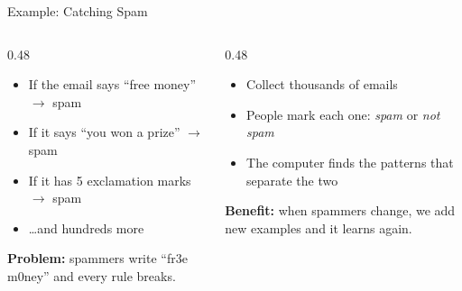 \begin{frame}{Example: Catching Spam}
    \begin{columns}[T]
        \begin{column}{0.48\textwidth}
            \begin{tcolorbox}[colback=red!5, colframe=red!50, title=\textbf{Writing rules by hand}, equal height group=spam]
                \small
                \begin{itemize}
                    \setlength\itemsep{0.3em}
                    \item If the email says ``free money'' $\rightarrow$ spam
                    \item If it says ``you won a prize'' $\rightarrow$ spam
                    \item If it has 5 exclamation marks $\rightarrow$ spam
                    \item \ldots and hundreds more
                \end{itemize}
                \vspace{0.4em}
                \textbf{Problem:} spammers write ``fr3e m0ney'' and every rule breaks.
            \end{tcolorbox}
        \end{column}
        \begin{column}{0.48\textwidth}
            \begin{tcolorbox}[colback=blue!5, colframe=blue!50, title=\textbf{Learning from examples}, equal height group=spam]
                \small
                \begin{itemize}
                    \setlength\itemsep{0.3em}
                    \item Collect thousands of emails
                    \item People mark each one: \textit{spam} or \textit{not spam}
                    \item The computer finds the patterns that separate the two
                \end{itemize}
                \vspace{0.4em}
                \textbf{Benefit:} when spammers change, we add new examples and it learns again.
            \end{tcolorbox}
        \end{column}
    \end{columns}
\end{frame}


